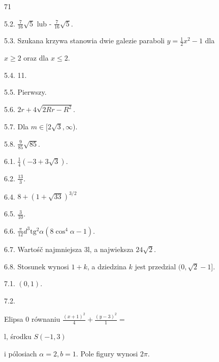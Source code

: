 \documentclass[a4paper,12pt]{article}
\begin{document}
71

5.2. $\displaystyle \frac{7}{16}\sqrt{5}$ lub - $\displaystyle \frac{7}{16}\sqrt{5}.$

5.3. Szukana krzywa stanowia dwie galezie paraboli $y= \displaystyle \frac{1}{2}x^{2}-1$ dla

$x\geq 2$ oraz dla $x\leq 2.$

5.4. 11.

5.5. Pierwszy.

5.6. $2r+4\sqrt{2Rr-R^{2}}.$

5.7. Dla $ m\in [2\sqrt{3},\infty$).

5.8. $\displaystyle \frac{9}{85}\sqrt{85}.$

6.1. $\displaystyle \frac{1}{4}(-3+3\sqrt{3}).$

6.2. $\displaystyle \frac{13}{3}.$

6.4. $8+(1+\sqrt{33})^{3/2}$

6.5. $\displaystyle \frac{3}{10}.$

6.6. $\displaystyle \frac{\pi}{12}d^{3}\mathrm{t}\mathrm{g}^{2}\alpha(8\cos^{4}\alpha-1).$

6.7. Wartośč najmniejsza 3l, a najwieksza $24\sqrt{2}$.

6.8. Stosunek wynosi $1+k$, a dziedzina $k$ jest przedzial $(0,\sqrt{2}-1$].

7.1. $(0,1).$

7.2.

Elipsa $0$ równaniu $\displaystyle \frac{(x+1)^{2}}{4} + \displaystyle \frac{(y-3)^{2}}{1} =$

l, środku $S(-1,3)$

$\mathrm{i}$ pólosiach $\alpha=2, b=1$. Pole figury wynosi $2\pi.$
\end{document}
